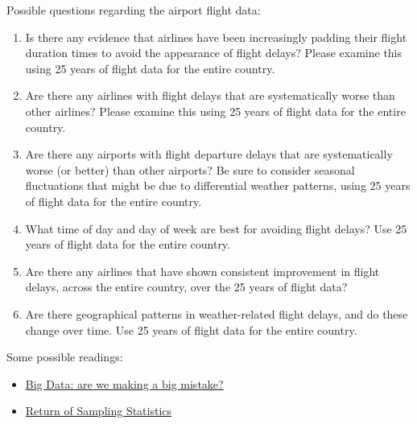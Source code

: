 \documentclass[14pt]{article}
\begin{document}
Possible questions regarding the airport flight data:

\begin{enumerate}

\item Is there any evidence that airlines have been increasingly padding their flight duration times to avoid the appearance of flight delays? Please examine this using 25 years of flight data for the entire country.

\item Are there any airlines with flight delays that are systematically worse than other airlines? Please examine this using 25 years of flight data for the entire country.

\item Are there any airports with flight departure delays that are systematically worse (or better) than other airports? Be sure to consider seasonal fluctuations that might be due to differential weather patterns, using 25 years of flight data for the entire country.

\item What time of day and day of week are best for avoiding flight delays? Use 25 years of flight data for the entire country.

\item Are there any airlines that have shown consistent improvement in flight delays, across the entire country, over the 25 years of flight data?

\item Are there geographical patterns in weather-related flight delays, and do these change over time. Use 25 years of flight data for the entire country.

\end{enumerate}

Some possible readings: \vspace*{.5in}

\begin{itemize}

\item \textcolor{blue}{\href{http://www.ft.com/cms/s/2/21a6e7d8-b479-11e3-a09a-00144feabdc0.html#axzz2zqWDPG2I}{Big Data: are we making a big mistake?}}

\item \textcolor{blue}{\href{http://datacommunitydc.org/blog/2014/03/will-big-data-bring-return-sampling-statistics-review-aaron-strausss-talk-dsdc/}{Return of Sampling Statistics}}

\end{itemize}
\end{document}
